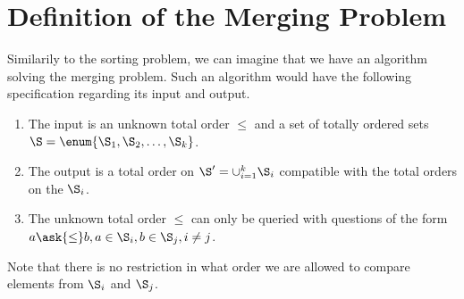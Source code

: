 \section{Definition of the Merging Problem}
\label{tree:merging:def}

Similarily to the sorting problem, we can imagine that we have an algorithm
solving the merging problem. Such an algorithm would have the following
specification regarding its input and output.

\begin{enumerate}
\item The input is an unknown total order \(\le\) and a set of totally ordered
sets \(\S = \enum{\S_1, \S_2, \ldots, \S_k}\).
\item The output is a total order on \(\S' = \cup_{i=1}^{k} \S_i\) compatible with
the total orders on the \(\S_i\).
\item The unknown total order \(\le\) can only be queried with questions of the
form \(a \ask{\le} b, a \in \S_i, b \in \S_j, i \neq j\).
\end{enumerate}

Note that there is no restriction in what order we are allowed to compare
elements from \(\S_i\) and \(\S_j\).

